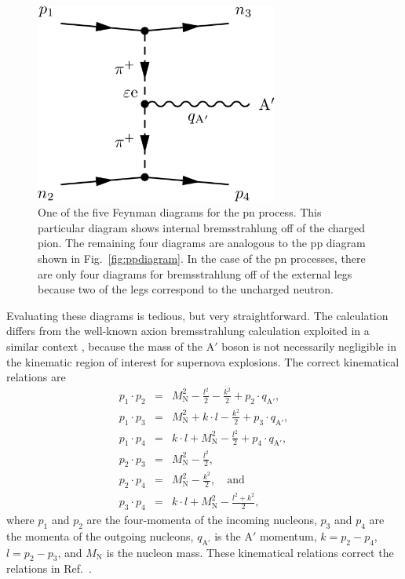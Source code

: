 \documentclass[nofootinbib,prd,superscriptaddress,twocolumn]{revtex4}
\newcommand{\bea}{\begin{eqnarray}}
\newcommand{\eea}{\end{eqnarray}}
\newcommand{\qa}{q_{\mathrm{A}'}}
\newcommand{\Aprime}{\mathrm{A}'}
\begin{document}
\begin{figure}[b]
\includegraphics[width=8cm]{npdiagram.pdf}
\caption{One of the five Feynman diagrams for the pn process. This particular diagram shows 
internal bremsstrahlung off of the charged pion. The remaining four diagrams are analogous to the 
pp diagram shown in Fig.~\ref{fig:ppdiagram}. In the case of the pn processes, there are only four 
diagrams for bremsstrahlung off of the external legs because two of the legs correspond to the 
uncharged neutron.}
\label{fig:npdiagram}
\end{figure}

	
Evaluating these diagrams is tedious, but very straightforward. The calculation differs 
from the well-known axion bremsstrahlung calculation exploited in a similar context \cite{raffelt96_book}, 
because the mass of the $\Aprime$ boson is not necessarily negligible in the kinematic 
region of interest for supernova explosions. The correct kinematical relations are 
%
\bea 
p_1 \cdot p_2 &=& M_{\mathrm N}^2 - \frac{l^2}{2} - \frac{k^2}{2} + p_2 \cdot \qa,\\
p_1 \cdot p_3 &=& M_{\mathrm N}^2 + k \cdot l - \frac{k^2}{2} + p_3 \cdot \qa,\\  
p_1 \cdot p_4 &=& k \cdot l + M_{\mathrm N}^2 - \frac{l^2}{2} + p_4 \cdot \qa, \\
p_2 \cdot p_3 &=& M_{\mathrm N}^2 - \frac{l^2}{2}, \\ 
p_2 \cdot p_4 &=& M_{\mathrm N}^2 - \frac{k^2}{2},\quad \mathrm{and}\\
p_3 \cdot p_4 &=& k \cdot l + M_{\mathrm N}^2 - \frac{l^2 + k^2}{2},
\eea
%
where $p_1$ and $p_2$ are the four-momenta of the incoming nucleons, $p_3$ and $p_4$ are the momenta 
of the outgoing nucleons, $\qa$ is the $\Aprime$ momentum, $k=p_2 - p_4$, $l=p_2 - p_3$, and $M_{\mathrm{N}}$ 
is the nucleon mass. These kinematical relations correct the relations in Ref.~\cite{dent_etal12}.
\end{document}
